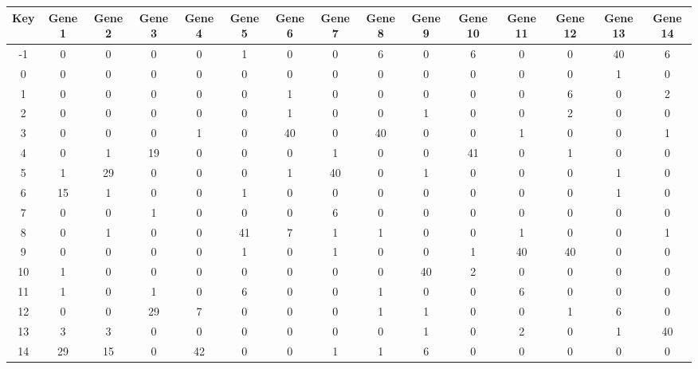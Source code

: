 \begin{tabular}{|c|c|c|c|c|c|c|c|c|c|c|c|c|c|c|}
\hline
Key & Gene 1 & Gene 2 & Gene 3 & Gene 4 & Gene 5 & Gene 6 & Gene 7 & Gene 8 & Gene 9 & Gene 10 & Gene 11 & Gene 12 & Gene 13 & Gene 14 \\
\hline
-1 & 0 & 0 & 0 & 0 & 1 & 0 & 0 & 6 & 0 & 6 & 0 & 0 & 40 & 6 \\
0 & 0 & 0 & 0 & 0 & 0 & 0 & 0 & 0 & 0 & 0 & 0 & 0 & 1 & 0 \\
1 & 0 & 0 & 0 & 0 & 0 & 1 & 0 & 0 & 0 & 0 & 0 & 6 & 0 & 2 \\
2 & 0 & 0 & 0 & 0 & 0 & 1 & 0 & 0 & 1 & 0 & 0 & 2 & 0 & 0 \\
3 & 0 & 0 & 0 & 1 & 0 & 40 & 0 & 40 & 0 & 0 & 1 & 0 & 0 & 1 \\
4 & 0 & 1 & 19 & 0 & 0 & 0 & 1 & 0 & 0 & 41 & 0 & 1 & 0 & 0 \\
5 & 1 & 29 & 0 & 0 & 0 & 1 & 40 & 0 & 1 & 0 & 0 & 0 & 1 & 0 \\
6 & 15 & 1 & 0 & 0 & 1 & 0 & 0 & 0 & 0 & 0 & 0 & 0 & 1 & 0 \\
7 & 0 & 0 & 1 & 0 & 0 & 0 & 6 & 0 & 0 & 0 & 0 & 0 & 0 & 0 \\
8 & 0 & 1 & 0 & 0 & 41 & 7 & 1 & 1 & 0 & 0 & 1 & 0 & 0 & 1 \\
9 & 0 & 0 & 0 & 0 & 1 & 0 & 1 & 0 & 0 & 1 & 40 & 40 & 0 & 0 \\
10 & 1 & 0 & 0 & 0 & 0 & 0 & 0 & 0 & 40 & 2 & 0 & 0 & 0 & 0 \\
11 & 1 & 0 & 1 & 0 & 6 & 0 & 0 & 1 & 0 & 0 & 6 & 0 & 0 & 0 \\
12 & 0 & 0 & 29 & 7 & 0 & 0 & 0 & 1 & 1 & 0 & 0 & 1 & 6 & 0 \\
13 & 3 & 3 & 0 & 0 & 0 & 0 & 0 & 0 & 1 & 0 & 2 & 0 & 1 & 40 \\
14 & 29 & 15 & 0 & 42 & 0 & 0 & 1 & 1 & 6 & 0 & 0 & 0 & 0 & 0 \\
\hline
\end{tabular}